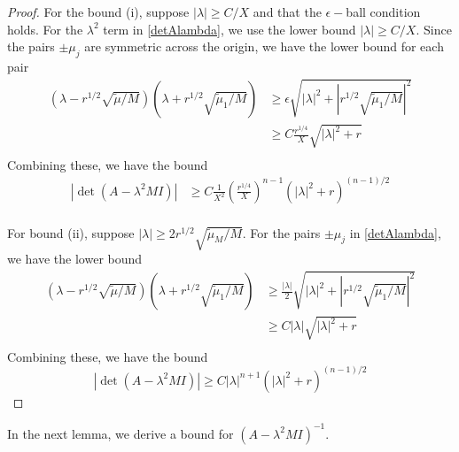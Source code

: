 \documentclass[thesis.tex]{subfiles}
\begin{document}
\begin{lemma}
\begin{proof}
For the bound (i), suppose $|\lambda| \geq C/X$ and that the $\epsilon-$ball condition holds. For the $\lambda^2$ term in \eqref{detAlambda}, we use the lower bound $|\lambda| \geq C/X$. Since the pairs $\pm \mu_j$ are symmetric across the origin, we have the lower bound for each pair
\begin{align*}
(\lambda - r^{1/2} \sqrt{\tilde{\mu}/M} )(\lambda + r^{1/2} \sqrt{\tilde{\mu}_1/M} )
&\geq \epsilon \sqrt{ |\lambda|^2 + |r^{1/2} \sqrt{\tilde{\mu}_1/M}|^2 } \\
&\geq C \frac{r^{1/4}}{X} \sqrt{ |\lambda|^2 + r } \\
\end{align*}
Combining these, we have the bound
\begin{align*}
|\det(A - \lambda^2 M I)|
&\geq C \frac{1}{X^2} \left( \frac{r^{1/4}}{X} \right)^{n-1} \left( |\lambda|^2 + r \right)^{(n-1)/2} \\
\end{align*}

For bound (ii), suppose $|\lambda| \geq 2 r^{1/2} \sqrt{\tilde{\mu}_M/M}$. For the pairs $\pm \mu_j$ in \eqref{detAlambda}, we have the lower bound
\begin{align*}
(\lambda - r^{1/2} \sqrt{\tilde{\mu}/M} )(\lambda + r^{1/2} \sqrt{\tilde{\mu}_1/M} )
&\geq \frac{|\lambda|}{2} \sqrt{ |\lambda|^2 + |r^{1/2} \sqrt{\tilde{\mu}_1/M}|^2 } \\
&\geq C |\lambda| \sqrt{ |\lambda|^2 + r } \\
\end{align*}
Combining these, we have the bound
\[
|\det(A - \lambda^2 M I)|
\geq C |\lambda|^{n+1} \left( |\lambda|^2 + r \right)^{(n-1)/2}
\]
\end{proof}
\end{lemma}

In the next lemma, we derive a bound for $(A - \lambda^2 M I)^{-1}$.
\end{document}
